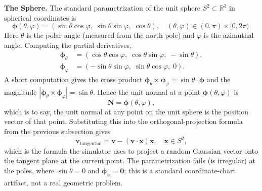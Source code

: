 \documentclass{article}
\begin{document}
\textbf{The Sphere.} The standard parametrization of the unit sphere $S^2 \subset \mathbb{R}^3$ in spherical coordinates is
$$\boldsymbol{\phi}(\theta, \varphi) = (\sin\theta \cos\varphi,\; \sin\theta \sin\varphi,\; \cos\theta), \quad (\theta, \varphi) \in (0, \pi) \times [0, 2\pi).$$
Here $\theta$ is the polar angle (measured from the north pole) and $\varphi$ is the azimuthal angle. Computing the partial derivatives,
\begin{align*}
\boldsymbol{\phi}_\theta &= (\cos\theta \cos\varphi,\; \cos\theta \sin\varphi,\; -\sin\theta), \\
\boldsymbol{\phi}_\varphi &= (-\sin\theta \sin\varphi,\; \sin\theta \cos\varphi,\; 0).
\end{align*}
A short computation gives the cross product $\boldsymbol{\phi}_\theta \times \boldsymbol{\phi}_\varphi = \sin\theta \cdot \boldsymbol{\phi}$ and the magnitude $|\boldsymbol{\phi}_\theta \times \boldsymbol{\phi}_\varphi| = \sin\theta$. Hence the unit normal at a point $\boldsymbol{\phi}(\theta, \varphi)$ is
$$\mathbf{N} = \boldsymbol{\phi}(\theta, \varphi),$$
which is to say, the unit normal at any point on the unit sphere is the position vector of that point. Substituting this into the orthogonal-projection formula from the previous subsection gives
$$\mathbf{v}_{\text{tangential}} = \mathbf{v} - (\mathbf{v} \cdot \mathbf{x}) \mathbf{x}, \quad \mathbf{x} \in S^2,$$
which is the formula the simulator uses to project a random Gaussian vector onto the tangent plane at the current point. The parametrization fails (is irregular) at the poles, where $\sin\theta = 0$ and $\boldsymbol{\phi}_\varphi = \mathbf{0}$; this is a standard coordinate-chart artifact, not a real geometric problem.
\end{document}
